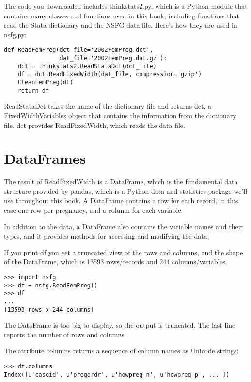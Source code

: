 \documentclass[]{book}
\begin{document}
The code you downloaded includes thinkstats2.py, which is a Python
module that contains many classes and functions used in this book,
including functions that read the Stata dictionary and the NSFG data
file. Here's how they are used in nsfg.py:

\begin{verbatim}
def ReadFemPreg(dct_file='2002FemPreg.dct',
                dat_file='2002FemPreg.dat.gz'):
    dct = thinkstats2.ReadStataDct(dct_file)
    df = dct.ReadFixedWidth(dat_file, compression='gzip')
    CleanFemPreg(df)
    return df
\end{verbatim}

ReadStataDct takes the name of the
dictionary file and returns dct, a FixedWidthVariables object that
contains the information from the dictionary file. dct provides ReadFixedWidth, which reads the
data file.

\hypertarget{dataframes}{%
\section{DataFrames}\label{dataframes}}

The result of ReadFixedWidth is a DataFrame,
which is the fundamental data structure provided by pandas, which is a
Python data and statistics package we'll use throughout this book. A
DataFrame contains a row for each record, in this case one row per
pregnancy, and a column for each variable.

In addition to the data, a DataFrame also
contains the variable names and their types, and it provides methods for
accessing and modifying the data.

If you print df you get a truncated view of the
rows and columns, and the shape of the DataFrame, which is 13593
rows/records and 244 columns/variables.

\begin{verbatim}
>>> import nsfg
>>> df = nsfg.ReadFemPreg()
>>> df
...
[13593 rows x 244 columns]
\end{verbatim}

The DataFrame is too big to display, so
the output is truncated. The last line reports the number of rows and
columns.

The attribute columns returns a sequence of
column names as Unicode strings:

\begin{verbatim}
>>> df.columns
Index([u'caseid', u'pregordr', u'howpreg_n', u'howpreg_p', ... ])
\end{verbatim}
\end{document}
